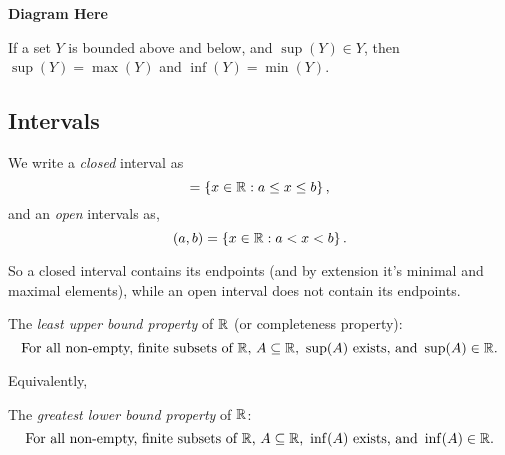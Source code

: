 \documentclass[12pt]{article}
\theoremstyle{definition}
\begin{document}
    \textbf{Diagram Here}

    If a set $Y$ is bounded above and below, and $\sup{(Y)} \in Y$, then $\sup{(Y)} = \max{(Y)}$ and $\inf{(Y)} = \min{(Y)}$.

    \subsection{Intervals}
    We write a \textit{closed} interval as
    \begin{equation*}
        [a, b] = \set{x \in \R: a \leq x \leq b},
    \end{equation*}
    and an \textit{open} intervals as,
    \begin{equation*}
        (a, b) = \set{x \in \R: a < x < b}.
    \end{equation*}

    So a closed interval contains its endpoints (and by extension it's minimal and maximal elements), while an open interval does not contain its endpoints. 

    \begin{definition}
        The \textit{least upper bound property} of $\R$ (or completeness property):
        \begin{equation*}
            \text{For all non-empty, finite subsets of $\R$, $A \subseteq \R$,} ~ \sup(A) ~ \text{exists, and} ~ \sup(A) \in \R.
        \end{equation*}
    \end{definition}
    Equivalently, 
    \begin{definition}
        The \textit{greatest lower bound property} of $\R$:
        \begin{equation*}
            \text{For all non-empty, finite subsets of $\R$, $A \subseteq \R$,} ~ \inf(A) ~ \text{exists, and} ~ \inf(A) \in \R.
        \end{equation*}
    \end{definition}
\end{document}
